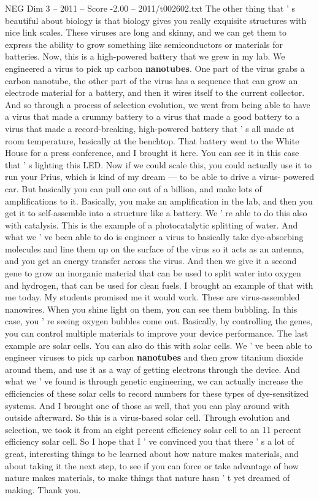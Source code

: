 \begin{textsample}{NEG Dim 3 – 2011 – Score -2.00 – 2011/t002602.txt}
The other thing that ' s beautiful about biology is that biology gives you really exquisite structures with nice link scales.
These viruses are long and skinny, and we can get them to express the ability to grow something like semiconductors or materials for batteries.
Now, this is a high-powered battery that we grew in my lab.
We engineered a virus to pick up carbon \textbf{nanotubes}.
One part of the virus grabs a carbon nanotube, the other part of the virus has a sequence that can grow an electrode material for a battery, and then it wires itself to the current collector.
And so through a process of selection evolution, we went from being able to have a virus that made a crummy battery to a virus that made a good battery to a virus that made a record-breaking, high-powered battery that ' s all made at room temperature, basically at the benchtop.
That battery went to the White House for a press conference, and I brought it here.
You can see it in this case that ' s lighting this LED.
Now if we could scale this, you could actually use it to run your Prius, which is kind of my dream — to be able to drive a virus- powered car.
But basically you can pull one out of a billion, and make lots of amplifications to it.
Basically, you make an amplification in the lab, and then you get it to self-assemble into a structure like a battery.
We ' re able to do this also with catalysis.
This is the example of a photocatalytic splitting of water.
And what we ' ve been able to do is engineer a virus to basically take dye-absorbing molecules and line them up on the surface of the virus so it acts as an antenna, and you get an energy transfer across the virus.
And then we give it a second gene to grow an inorganic material that can be used to split water into oxygen and hydrogen, that can be used for clean fuels.
I brought an example of that with me today.
My students promised me it would work.
These are virus-assembled nanowires.
When you shine light on them, you can see them bubbling.
In this case, you ' re seeing oxygen bubbles come out.
Basically, by controlling the genes, you can control multiple materials to improve your device performance.
The last example are solar cells.
You can also do this with solar cells.
We ' ve been able to engineer viruses to pick up carbon \textbf{nanotubes} and then grow titanium dioxide around them, and use it as a way of getting electrons through the device.
And what we ' ve found is through genetic engineering, we can actually increase the efficiencies of these solar cells to record numbers for these types of dye-sensitized systems.
And I brought one of those as well, that you can play around with outside afterward.
So this is a virus-based solar cell.
Through evolution and selection, we took it from an eight percent efficiency solar cell to an 11 percent efficiency solar cell.
So I hope that I ' ve convinced you that there ' s a lot of great, interesting things to be learned about how nature makes materials, and about taking it the next step, to see if you can force or take advantage of how nature makes materials, to make things that nature hasn ' t yet dreamed of making.
Thank you.

\end{textsample}

